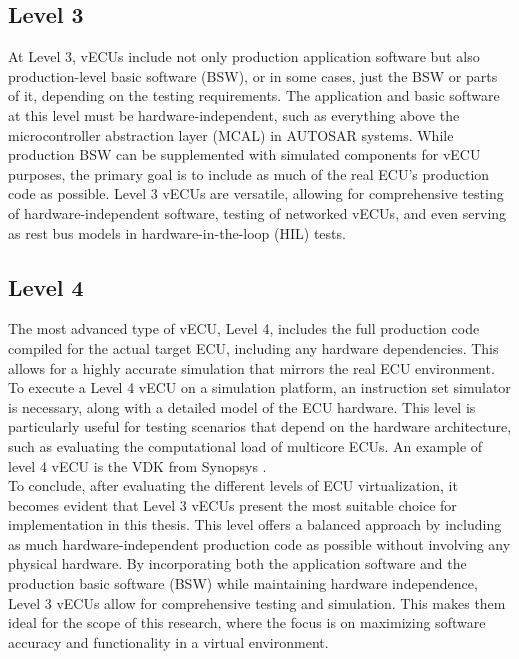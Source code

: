 \subsection{Level 3}
At Level 3, vECUs include not only production application software but also production-level basic software (BSW), or in some cases, just the BSW or parts of it, depending on the testing requirements. The application and basic software at this level must be hardware-independent, such as everything above the microcontroller abstraction layer (MCAL) in AUTOSAR systems. While production BSW can be supplemented with simulated components for vECU purposes, the primary goal is to include as much of the real ECU's production code as possible. Level 3 vECUs are versatile, allowing for comprehensive testing of hardware-independent software, testing of networked vECUs, and even serving as rest bus models in hardware-in-the-loop (HIL) tests.

\subsection{Level 4}
The most advanced type of vECU, Level 4, includes the full production code compiled for the actual target ECU, including any hardware dependencies. This allows for a highly accurate simulation that mirrors the real ECU environment. To execute a Level 4 vECU on a simulation platform, an instruction set simulator is necessary, along with a detailed model of the ECU hardware. This level is particularly useful for testing scenarios that depend on the hardware architecture, such as evaluating the computational load of multicore ECUs. An example of level 4 vECU is the VDK from Synopsys \cite{synopsys_aurix_vdk_2020}. \\

To conclude, after evaluating the different levels of ECU virtualization, it becomes evident that Level 3 vECUs present the most suitable choice for implementation in this thesis. This level offers a balanced approach by including as much hardware-independent production code as possible without involving any physical hardware. By incorporating both the application software and the production basic software (BSW) while maintaining hardware independence, Level 3 vECUs allow for comprehensive testing and simulation. This makes them ideal for the scope of this research, where the focus is on maximizing software accuracy and functionality in a virtual environment.

